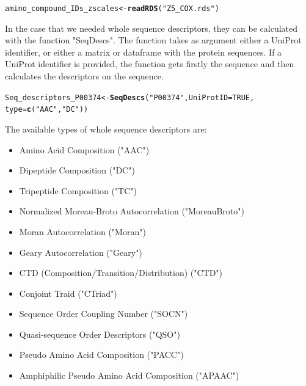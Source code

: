 \documentclass[twoside,a4wide,12pt]{article}\usepackage[]{graphicx}\usepackage[]{color}
\makeatletter
\newcommand{\hlnum}[1]{\textcolor[rgb]{0.686,0.059,0.569}{#1}}%
\newcommand{\hlstr}[1]{\textcolor[rgb]{0.192,0.494,0.8}{#1}}%
\newcommand{\hlstd}[1]{\textcolor[rgb]{0.345,0.345,0.345}{#1}}%
\newcommand{\hlkwb}[1]{\textcolor[rgb]{0.69,0.353,0.396}{#1}}%
\newcommand{\hlkwc}[1]{\textcolor[rgb]{0.333,0.667,0.333}{#1}}%
\newcommand{\hlkwd}[1]{\textcolor[rgb]{0.737,0.353,0.396}{\textbf{#1}}}%
\newenvironment{kframe}{%
 \def\at@end@of@kframe{}%
 \ifinner\ifhmode%
  \def\at@end@of@kframe{\end{minipage}}%
  \begin{minipage}{\columnwidth}%
 \fi\fi%
 \def\FrameCommand##1{\hskip\@totalleftmargin \hskip-\fboxsep
 \colorbox{shadecolor}{##1}\hskip-\fboxsep
     \hskip-\linewidth \hskip-\@totalleftmargin \hskip\columnwidth}%
 \MakeFramed {\advance\hsize-\width
   \@totalleftmargin\z@ \linewidth\hsize
   \@setminipage}}%
 {\par\unskip\endMakeFramed%
 \at@end@of@kframe}
\newenvironment{knitrout}{}{} %
\makeatother
\begin{document}
\begin{knitrout}
\color{fgcolor}\begin{kframe}
\begin{alltt}
\hlstd{amino_compound_IDs_zscales} \hlkwb{<-} \hlkwd{readRDS}\hlstd{(}\hlstr{"Z5_COX.rds"}\hlstd{)}
\end{alltt}
\end{kframe}
\end{knitrout}


In the case that we needed whole sequence descriptors, they can be calculated with the function "SeqDescs". 
The function takes as argument either a UniProt identifier, or either a matrix or dataframe with the protein sequences.
If a UniProt identifier is provided, the function gets firstly the sequence and then calculates the descriptors on the sequence.

\begin{knitrout}
\color{fgcolor}\begin{kframe}
\begin{alltt}
\hlstd{Seq_descriptors_P00374} \hlkwb{<-} \hlkwd{SeqDescs}\hlstd{(}\hlstr{"P00374"}\hlstd{,} \hlkwc{UniProtID} \hlstd{=} \hlnum{TRUE}\hlstd{,}
    \hlkwc{type} \hlstd{=} \hlkwd{c}\hlstd{(}\hlstr{"AAC"}\hlstd{,} \hlstr{"DC"}\hlstd{))}
\end{alltt}
\end{kframe}
\end{knitrout}

The available types of whole sequence descriptors are:\cite{protr}
\begin{itemize}
\item Amino Acid Composition ("AAC")
\item Dipeptide Composition ("DC")
\item Tripeptide Composition ("TC")
\item Normalized Moreau-Broto Autocorrelation ("MoreauBroto")
\item Moran Autocorrelation ("Moran")
\item Geary Autocorrelation ("Geary")
\item  CTD (Composition/Transition/Distribution) ("CTD")
\item Conjoint Traid ("CTriad")
\item Sequence Order Coupling Number ("SOCN")
\item Quasi-sequence Order Descriptors ("QSO")
\item Pseudo Amino Acid Composition ("PACC")
\item Amphiphilic Pseudo Amino Acid Composition ("APAAC")
\end{itemize}
\end{document}
